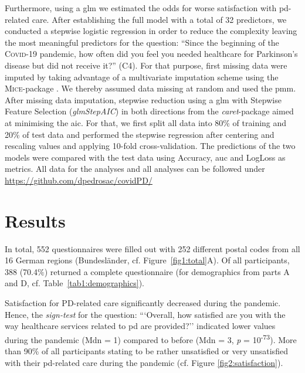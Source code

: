 \documentclass{bmcart}
\begin{document}
Furthermore, using a \ac{glm} we estimated the odds for worse satisfaction with \ac{pd}-related care. After establishing the full model with a total of 32 predictors, we conducted a stepwise logistic regression in order to reduce the complexity leaving the most meaningful predictors for the question: ``Since the beginning of the \textsc{Covid}-19 pandemic, how often did you feel you needed healthcare for Parkinson’s disease but did not receive it?'' (C4). For that purpose, first missing data were imputed by taking advantage of a multivariate imputation scheme using the \textsc{Mice}-package \cite{vanbuuren2011}. We thereby assumed data missing at random and used the \ac{pmm}. After missing data imputation, stepwise reduction using a \ac{glm} with Stepwise Feature Selection (\textit{glmStepAIC}) in both directions from the \textit{caret}-package \cite{kuhn2008} aimed at minimising the \ac{aic}. For that, we first split all data into 80\% of training and 20\% of test data and performed the stepwise regression after centering and rescaling values and applying 10-fold cross-validation. The predictions of the two models were compared with the test data using Accuracy, \ac{auc} and LogLoss as metrics. All data for the analyses and all analyses can be followed under \url{https://github.com/dpedrosac/covidPD/}

\newpage

\section*{Results}
In total, 552 questionnaires were filled out with 252 different postal codes from all 16 German regions (Bundesländer, cf. Figure~\ref{fig1:total}A). Of all participants, 388 (70.4$\%$) returned a complete questionnaire (for demographics from parts A and D, cf. Table~\ref{tab1:demographics}). 

Satisfaction for PD-related care significantly decreased during the pandemic. Hence, the \textit{sign-test} for the question: ```Overall, how satisfied are you with the way healthcare services related to \acl{pd} are provided?'' indicated lower values during the pandemic (Mdn = 1) compared to before (Mdn = 3, \textit{p} = 10\textsuperscript{-73}). More than 90\% of all participants stating to be rather unsatisfied or very unsatisfied with their \ac{pd}-related care during the pandemic (cf. Figure \ref{fig2:satisfaction}). 
\end{document}
